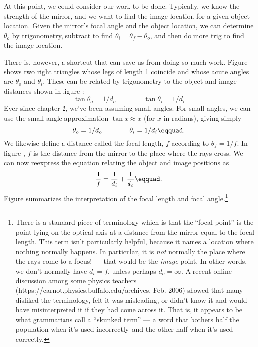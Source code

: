 At this point, we could consider our work to be done.
Typically, we know the strength of the mirror, and we want
to find the image location for a given object location.
Given the mirror's focal angle and the object location, we
can determine $\theta_o$ by trigonometry, subtract to find
$\theta_i=\theta_f-\theta_o$, and then do more trig to
find the image location.

There is, however, a shortcut that can save us from doing so
much work. Figure  shows two right triangles whose legs
of length 1 coincide and whose acute angles are $\theta_o$
and $\theta_i$. These can be related by trigonometry to the
object and image distances shown in figure :
\begin{equation*}
                \tan  \theta_o = 1/d_o \qquad \qquad        \tan  \theta_i  =  1/d_i
\end{equation*}
Ever since chapter 2, we've been assuming small angles. For
small angles, we can use the small-angle approximation 
$\tan x\approx x$ (for $x$ in radians), giving simply
\begin{equation*}
                \theta_o = 1/d_o \qquad\qquad \theta_i  =  1/d_i\eqquad.
\end{equation*}
We likewise define a distance called the focal length, $f$ according to $\theta_f=1/f$. In figure , $f$
is the distance from the mirror to the place where the rays cross. We can
now reexpress the equation relating the object and image positions as
\begin{equation*}
        \frac{1}{f} = \frac{1}{d_i}+\frac{1}{d_o}\eqquad.
\end{equation*}
Figure  summarizes the interpretation of the focal
length and focal angle.\footnote{There is a standard piece of terminology
which is that the ``focal point'' is the point lying on the optical
axis at a distance from the mirror equal to the focal length.
This term isn't particularly helpful, because it names a location where nothing
normally happens. In particular, it is \emph{not} normally the place where
the rays come to a focus! --- that would be the \emph{image} point.
In other words, we don't normally have $d_i=f$, unless perhaps
$d_o=\infty$. A recent online discussion among some physics teachers 
(https://carnot.physics.buffalo.edu/archives, Feb. 2006) showed that
many disliked the terminology, felt it was misleading, or didn't know it and would have
misinterpreted it if they had come across it. That is, it appears to be what grammarians
call a ``skunked term'' --- a word that bothers half the population when it's used
incorrectly, and the other half when it's used correctly.}

